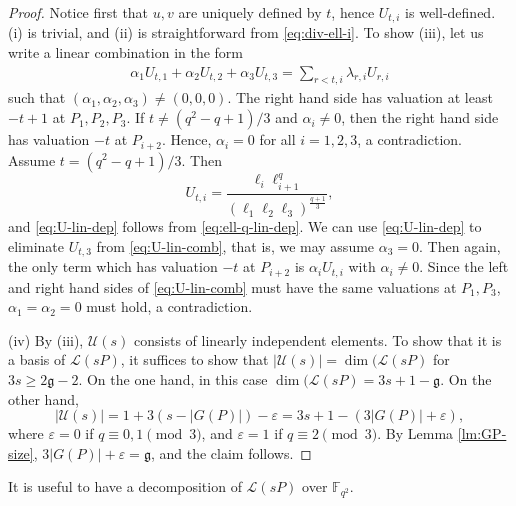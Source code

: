 \documentclass[a4paper]{amsart}
\theoremstyle{plain}
\theoremstyle{definition}
\theoremstyle{remark}
\newcommand{\g}{\mathfrak{g}}
\begin{document}
\begin{proof}
Notice first that $u,v$ are uniquely defined by $t$, hence $U_{t,i}$ is well-defined. (i) is trivial, and (ii) is straightforward from \eqref{eq:div-ell-i}. To show (iii), let us write a linear combination in the form
\begin{align} \label{eq:U-lin-comb}
\alpha_1 U_{t,1}+\alpha_2 U_{t,2} + \alpha_3 U_{t,3} = \sum_{r<t, i} \lambda_{r,i} U_{r,i}
\end{align}
such that $(\alpha_1,\alpha_2,\alpha_3)\neq (0,0,0)$. The right hand side has valuation at least $-t+1$ at $P_1,P_2,P_3$. If $t\neq (q^2-q+1)/3$ and $\alpha_i\neq 0$, then the right hand side has valuation $-t$ at $P_{i+2}$. Hence, $\alpha_i=0$ for all $i=1,2,3$, a contradiction. Assume $t=(q^2-q+1)/3$. Then
\[U_{t,i}=\frac{\ell_i\ell_{i+1}^q}{(\ell_1\ell_2\ell_3)^\frac{q+1}{3}},\]
and \eqref{eq:U-lin-dep} follows from \eqref{eq:ell-q-lin-dep}. We can use \eqref{eq:U-lin-dep} to eliminate $U_{t,3}$ from \eqref{eq:U-lin-comb}, that is, we may assume $\alpha_3=0$. Then again, the only term which has valuation $-t$ at $P_{i+2}$ is $\alpha_iU_{t,i}$ with $\alpha_i\neq 0$. Since the left and right hand sides of \eqref{eq:U-lin-comb} must have the same valuations at $P_1,P_3$, $\alpha_1=\alpha_2=0$ must hold, a contradiction. 

(iv) By (iii), $\mathcal{U}(s)$ consists of linearly independent elements. To show that it is a basis of $\mathscr{L}(sP)$, it suffices to show that $|\mathcal{U}(s)|=\dim(\mathscr{L}(sP)$ for $3s\geq 2\g-2$. On the one hand, in this case $\dim(\mathscr{L}(sP) = 3s+1-\g$. On the other hand, 
\[|\mathcal{U}(s)|=1+3(s-|G(P)|)-\varepsilon = 3s+1-(3|G(P)|+\varepsilon),\]
where $\varepsilon=0$ if $q\equiv0,1\pmod3$, and $\varepsilon=1$ if $q\equiv 2\pmod3$. By Lemma \ref{lm:GP-size}, $3|G(P)|+\varepsilon = \g$, and the claim follows. 
\end{proof}

It is useful to have a decomposition of $\mathscr{L}(sP)$ over $\mathbb{F}_{q^2}$.
\end{document}
